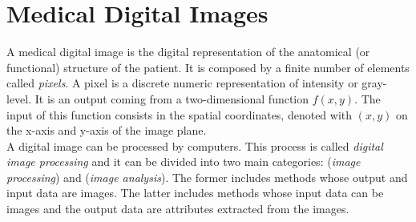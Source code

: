 \documentclass{standalone}
\begin{document}
\section{Medical Digital Images}

A medical digital image is the digital representation of the anatomical (or functional) structure of the patient.
It is composed by a finite number of elements called \textit{pixels}.
A pixel is a discrete numeric representation of intensity or gray-level. It is an output coming from a two-dimensional function $f(x, y)$. 
The input of this function consists in the spatial coordinates, denoted with $(x, y)$ on the x-axis and y-axis of the image plane\cite{Gonzalez}.\\
A digital image can be processed by computers.
This process is called \textit{digital image processing} and it can be divided into two main categories: (\textit{image processing}) and (\textit{image analysis}).
The former includes methods whose output and input data are images.
The latter includes methods whose input data can be images and the output data are attributes extracted from the images.
\end{document}
